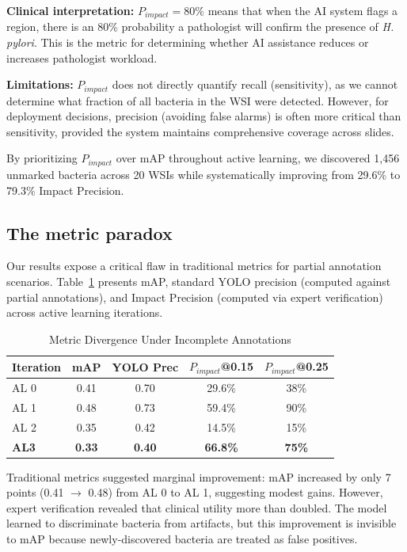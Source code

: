 \documentclass[sigconf, review, nonacm]{acmart}
\begin{document}
\noindent \textbf{Clinical interpretation:} $P_{impact} = 80\%$ means that when the AI system flags a region, there is an 80\% probability a pathologist will confirm the presence of \textit{H. pylori}. This is the metric for determining whether AI assistance reduces or increases pathologist workload.

\noindent \textbf{Limitations:} $P_{impact}$ does not directly quantify recall (sensitivity), as we cannot determine what fraction of all bacteria in the WSI were detected. However, for deployment decisions, precision (avoiding false alarms) is often more critical than sensitivity, provided the system maintains comprehensive coverage across slides.

By prioritizing $P_{impact}$ over mAP throughout active learning, we discovered 1,456 unmarked bacteria across 20 WSIs while systematically improving from 29.6\% to 79.3\% Impact Precision.

\subsection{The metric paradox}

Our results expose a critical flaw in traditional metrics for partial annotation scenarios. Table~\ref{tab:metric_paradox} presents mAP, standard YOLO precision (computed against partial annotations), and Impact Precision (computed via expert verification) across active learning iterations.
\vspace{-10pt}
\begin{table}[htb]
\centering
\caption{Metric Divergence Under Incomplete Annotations}
\label{tab:metric_paradox}
\small
\begin{tabular}{lcccc}
\toprule
\textbf{Iteration} & \textbf{mAP} & \textbf{YOLO Prec} & \textbf{$P_{impact}$@0.15} & \textbf{$P_{impact}$@0.25} \\
\midrule
AL 0  & 0.41 & 0.70 & 29.6\% & 38\% \\
AL 1  & 0.48 & 0.73 & 59.4\% & 90\% \\
AL 2  & 0.35 & 0.42 & 14.5\% & 15\% \\
\textbf{AL3} & \textbf{0.33} & \textbf{0.40} & \textbf{66.8\%} & \textbf{75\%} \\
\bottomrule
\end{tabular}
\end{table}

Traditional metrics suggested marginal improvement: mAP increased by only 7 points (0.41 $\rightarrow$ 0.48) from AL 0 to AL 1, suggesting modest gains. However, expert verification revealed that clinical utility more than doubled. The model learned to discriminate bacteria from artifacts, but this improvement is invisible to mAP because newly-discovered bacteria are treated as false positives.
\end{document}
